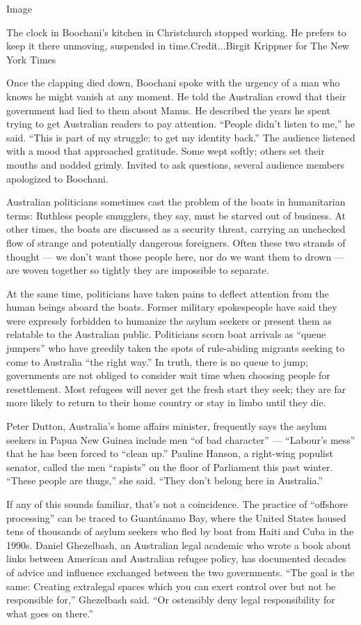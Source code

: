 Image

The clock in Boochani's kitchen in Christchurch stopped working. He
prefers to keep it there unmoving, suspended in time.Credit...Birgit
Krippner for The New York Times

Once the clapping died down, Boochani spoke with the urgency of a man
who knows he might vanish at any moment. He told the Australian crowd
that their government had lied to them about Manus. He described the
years he spent trying to get Australian readers to pay attention.
``People didn't listen to me,'' he said. ``This is part of my struggle:
to get my identity back.'' The audience listened with a mood that
approached gratitude. Some wept softly; others set their mouths and
nodded grimly. Invited to ask questions, several audience members
apologized to Boochani.

Australian politicians sometimes cast the problem of the boats in
humanitarian terms: Ruthless people smugglers, they say, must be starved
out of business. At other times, the boats are discussed as a security
threat, carrying an unchecked flow of strange and potentially dangerous
foreigners. Often these two strands of thought --- we don't want those
people here, nor do we want them to drown --- are woven together so
tightly they are impossible to separate.

At the same time, politicians have taken pains to deflect attention from
the human beings aboard the boats. Former military spokespeople have
said they were expressly forbidden to humanize the asylum seekers or
present them as relatable to the Australian public. Politicians scorn
boat arrivals as ``queue jumpers'' who have greedily taken the spots of
rule-abiding migrants seeking to come to Australia ``the right way.'' In
truth, there is no queue to jump; governments are not obliged to
consider wait time when choosing people for resettlement. Most refugees
will never get the fresh start they seek; they are far more likely to
return to their home country or stay in limbo until they die.

Peter Dutton, Australia's home affairs minister, frequently says the
asylum seekers in Papua New Guinea include men ``of bad character'' ---
``Labour's mess'' that he has been forced to ``clean up.'' Pauline
Hanson, a right-wing populist senator, called the men ``rapists'' on the
floor of Parliament this past winter. ``These people are thugs,'' she
said. ``They don't belong here in Australia.''

If any of this sounds familiar, that's not a coincidence. The practice
of ``offshore processing'' can be traced to Guantánamo Bay, where the
United States housed tens of thousands of asylum seekers who fled by
boat from Haiti and Cuba in the 1990s. Daniel Ghezelbash, an Australian
legal academic who wrote a book about links between American and
Australian refugee policy, has documented decades of advice and
influence exchanged between the two governments. ``The goal is the same:
Creating extralegal spaces which you can exert control over but not be
responsible for,'' Ghezelbash said. ``Or ostensibly deny legal
responsibility for what goes on there.''

